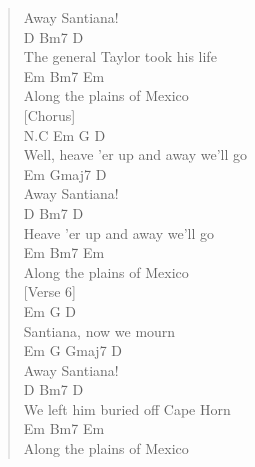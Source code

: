 \documentclass[11pt]{article}
\begin{document}
\begin{verse}
Away Santiana!\\
\hspace*{4em}D              Bm7      D\\
The general Taylor took his life\\
\hspace*{1em}Em       Bm7       Em\\
Along the plains of Mexico\\
\vspace*{1em}
\vspace*{1em}
[Chorus]\\
N.C Em                  G         D\\
Well, heave 'er up and away we'll go\\
\hspace*{1em}Em     Gmaj7 D\\
Away Santiana!\\
D                  Bm7        D\\
\hspace*{1em}Heave 'er up and away we'll go\\
\hspace*{1em}Em       Bm7       Em\\
Along the plains of Mexico\\
\vspace*{1em}
\vspace*{1em}
[Verse 6]\\
Em        G      D\\
Santiana, now we mourn\\
\hspace*{1em}Em  G   Gmaj7 D\\
Away Santiana!\\
\hspace*{3em}D               Bm7      D\\
We left him buried off Cape Horn\\
\hspace*{1em}Em       Bm7       Em\\
Along the plains of Mexico\\
\end{verse}
\clearpage
\end{document}
